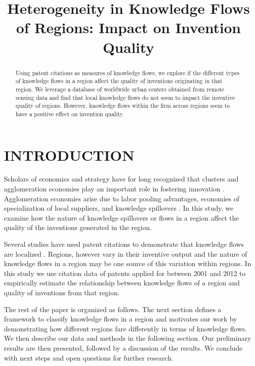 \documentclass[parskip=full,11pt,letterpaper]{article}
\begin{document}
\setlength{\droptitle}{-5em}
\title{\textbf{\large Heterogeneity in Knowledge Flows of Regions: Impact on Invention Quality}}
\date{\vspace{-12ex}}

\maketitle
\thispagestyle{empty}
\renewcommand{\abstractname}{\large ABSTRACT}
\begin{abstract}
\normalsize
\noindent Using patent citations as measures of knowledge flows, we explore if the different types of knowledge flows in a region affect the quality of inventions originating in that region. We leverage a database of worldwide urban centers  obtained from remote sensing data and find that  local knowledge flows  do not seem to impact the inventive quality of regions. However, knowledge flows within the firm across regions seem to have a positive effect on invention quality.
\end{abstract}

\section*{INTRODUCTION}
Scholars of economics and strategy have for long recognized that clusters and agglomeration economies play an important role in fostering innovation \citep{Marshall1890, Porter1990}. Agglomeration economies arise due to labor pooling advantages, economies of specialization of local suppliers, and knowledge spillovers \citep{Porter1990, Krugman1991a}. In this study, we examine how the nature of knowledge spillovers or flows in a region affect the quality of the inventions generated in the region.\par
Several studies have used patent citations to demonstrate that knowledge flows are localized \citep*{Jaffe1993, Almeida1999, Alcacer2006a}. Regions, however vary in their inventive output \citep*{Agrawal2014b} and the nature of knowledge flows in a region may be one source of this variation within regions. In this study we use citation data of patents applied for between 2001 and 2012 to empirically estimate the relationship between knowledge flows of a region and quality of inventions from that region. \par
The rest of the paper is organized as follows. The next section defines a framework to classify knowledge flows in a region and motivates our work by demonstrating how different regions fare differently in terms of knowledge flows. We then describe our data and methods in the following section. Our preliminary results are then presented, followed by a discussion of the results. We conclude with next steps and open questions for further research.
\end{document}
